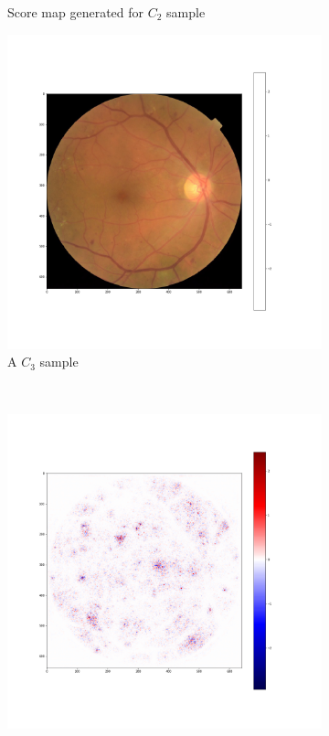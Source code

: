 \documentclass[preprint]{elsarticle}
\theoremstyle{definition} %
\theoremstyle{remark}
\begin{document}
\begin{figure}[h!]
\begin{subfigure}[b]{0.45\textwidth}
		\caption{Score map generated for $C_2$ sample}
	\end{subfigure}
	\begin{subfigure}[b]{0.45\textwidth}
		\includegraphics[width=\textwidth]{figures/class_maps/10077_right_1.png}
		\caption{A $C_3$ sample}
	\end{subfigure}~
	\begin{subfigure}[b]{0.45\textwidth}
		\includegraphics[width=\textwidth]{figures/class_maps/10077_right_2.png}

\end{subfigure}
\end{figure}
\end{document}
